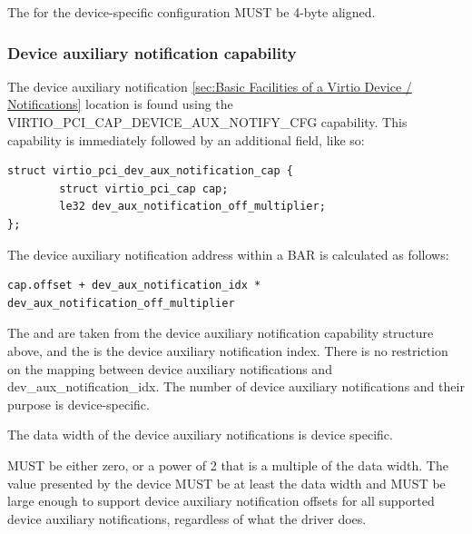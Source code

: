 The  for the device-specific configuration MUST be 4-byte aligned.

\subsubsection{Device auxiliary notification capability}\label{sec:Virtio Transport Options / Virtio Over PCI Bus / PCI Device Layout / Device auxiliary notification capability}

The device auxiliary notification \ref{sec:Basic Facilities of a Virtio Device / Notifications}
location is found using the VIRTIO_PCI_CAP_DEVICE_AUX_NOTIFY_CFG capability. This
capability is immediately followed by an additional field, like so:

\begin{lstlisting}
struct virtio_pci_dev_aux_notification_cap {
        struct virtio_pci_cap cap;
        le32 dev_aux_notification_off_multiplier;
};
\end{lstlisting}

The device auxiliary notification address within a BAR is calculated as follows:

\begin{lstlisting}
cap.offset + dev_aux_notification_idx * dev_aux_notification_off_multiplier
\end{lstlisting}

The  and 
are taken from the device auxiliary notification capability
structure above, and the  is the
device auxiliary notification index. There is no restriction on
the mapping between device auxiliary notifications and
dev_aux_notification_idx. The number of device auxiliary
notifications and their purpose is device-specific.


The data width of the device auxiliary notifications is device specific.

 MUST be either zero,
or a power of 2 that is a multiple of the data width.
The value  presented by the device MUST be at
least the data width and MUST be large enough to support device
auxiliary notification offsets for all supported device auxiliary
notifications, regardless of what the driver does.

